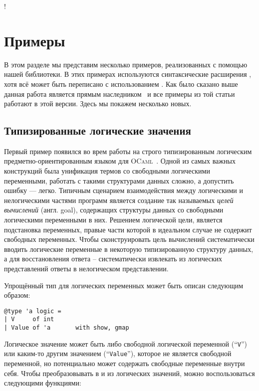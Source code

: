 !\section{Примеры}
\label{sec:examples}

В этом разделе мы представим несколько примеров, реализованных с помощью нашей библиотеки. В этих примерах используются синтаксические расширения , хотя всё может быть переписано с использованием . Как было сказано выше данная работа является прямым наследником~\cite{TransformationObjects} и все примеры из той статьи работают в этой версии. Здесь мы покажем несколько новых.

\subsection{Типизированные логические значения}

Первый пример появился во врем работы на строго типизированным логическим предметно-ориентированным языком для \textsc{OCaml}~\cite{OCanren}. 
Одной из самых важных конструкций была унификация термов со свободными логическими переменными, работать с такими структурами данных сложно, а допустить ошибку --- легко. Типичным сценарием взаимодействия  между логическими и нелогическими частями программ является 
создание так называемых \emph{целей вычислений} (англ. goal), содержащих структуры данных со свободными логическими переменными в них.
Решением логической цели, является подстановка переменных, правые части которой в идеальном случае не содержит свободных переменных. Чтобы
сконструировать цель вычислений систематически вводить логические переменные в некоторую типизированную структуру данных,  а для восстановления ответа -- систематически извлекать из логических представлений ответы в нелогическом представлении.

Упрощённый тип для логических переменных может быть описан следующим образом:

\begin{lstlisting}
@type 'a logic =
| V     of int
| Value of 'a       with show, gmap
\end{lstlisting}

Логическое значение может быть либо свободной логической переменной (``\lstinline{V}'') или каким-то другим значением (``\lstinline{Value}''), которое не является свободной переменной, но потенциально может содержать свободные переменные внутри себя. Чтобы преобразовывать в и из логических значений, можно воспользоваться следующими функциями:

